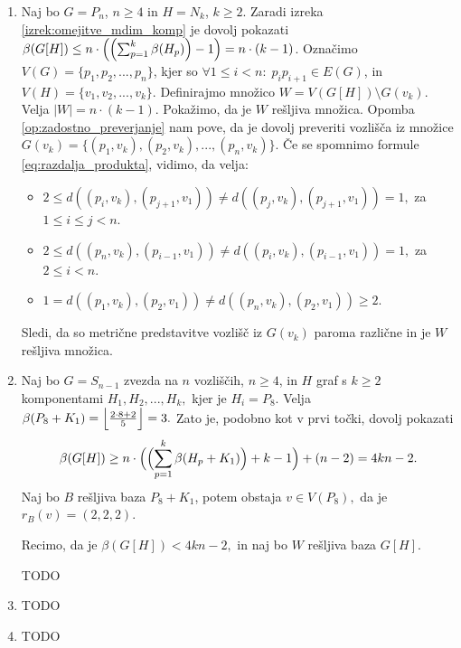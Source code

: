 \documentclass[mat1, tisk]{fmfdelo}
\newcommand{\1}{(1, 1, ..., 1)}
\newcommand{\2}{(2, 2, ..., 2)}
\begin{document}
    \begin{dokaz}
        \begin{enumerate}
            \item Naj bo $G = P_n$, $n\geq 4$ in $H = N_k$, $k\geq 2$. 
            Zaradi izreka \ref{izrek:omejitve_mdim_komp} je dovolj pokazati 
            $\beta(G[H]) \leq n \cdot \Bigl ( \Bigl ( \sum_{p=1}^{k} \beta(H_p) \Bigr )  - 1  \Bigr ) = n 
            \cdot (k - 1)$. Označimo $V(G) = \{p_1 , p_2, ..., p_n\}$, kjer so $\forall 1 \leq i < n : \; 
            p_i p_{i+1} \in E(G)$, in $V(H) = \{ v_1, v_2, ..., v_k\}.$ Definirajmo množico 
            $W = V(G[H]) \setminus G(v_k).$ Velja $|W| = n \cdot (k-1).$ 
            Pokažimo, da je $W$ rešljiva množica. Opomba \ref{op:zadostno_preverjanje} nam pove, da je dovolj preveriti
            vozlišča iz množice $G(v_k) = \{ (p_1, v_k), (p_2, v_k), ..., (p_n, v_k)\}$. Če se spomnimo formule
            \ref{eq:razdalja_produkta}, vidimo, da velja:
            \begin{itemize}
                \item $2 \leq d((p_i, v_k), (p_{j+1}, v_1)) \neq d((p_j, v_k), (p_{j + 1}, v_1)) = 1,$ 
                za $ 1 \leq i \leq j < n $.
                \item $2 \leq d((p_n, v_k), (p_{i-1}, v_1)) \neq d((p_i, v_k), (p_{i- 1}, v_1)) = 1,$ 
                za $ 2 \leq i < n $.
                \item $1 = d((p_1, v_k), (p_2, v_1)) \neq d((p_n, v_k), (p_2, v_1)) \geq 2.$
            \end{itemize}
            Sledi, da so metrične predstavitve vozlišč iz $G(v_k)$ paroma različne in je $W$ rešljiva množica.
    
            \item Naj bo $G = S_{n-1}$ zvezda na $n$ vozliščih, $n\geq 4$, in $H$ graf s $k \geq 2$ komponentami
            $H_1, H_2, ..., H_k,$ kjer je $H_i = P_8.$ Velja $\beta(P_8 + K_1) = 
            \Bigl \lfloor \frac{2\cdot 8 + 2}{5} \Bigr \rfloor = 3. $ %
            Zato je, podobno kot v prvi točki, dovolj pokazati  
            $$\beta(G[H]) \geq n \cdot \Bigl ( \Bigl ( \sum_{p=1}^{k} \beta(H_p + K_1) \Bigr ) + k - 1 \Bigr ) + 
            (n-2) = 4kn - 2.$$ 
            Naj bo $B$ rešljiva baza $P_8 + K_1$, potem obstaja $v \in V(P_8),$ da je $r_B(v) = (2, 2, 2).$
    
            Recimo, da je $\beta(G[H]) < 4kn - 2,$ in naj bo $W$ rešljiva baza $G[H]$. 
            
            TODO
    
            \item TODO
            \item TODO
    
        \end{enumerate}
    \end{dokaz}
\end{document}
